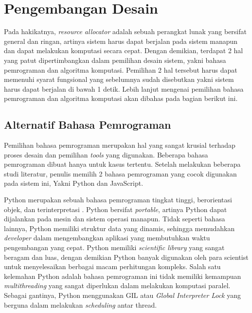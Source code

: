 \section{Pengembangan Desain}
    Pada hakikatnya, \textit{resource allocator} adalah sebuah perangkat lunak yang bersifat general dan ringan, artinya sistem harus dapat berjalan pada sistem manapun
    dan dapat melakukan komputasi secara cepat. Dengan demikian, terdapat 2 hal yang patut dipertimbangkan dalam pemilihan desain sistem, yakni bahasa pemrograman dan algoritma komputasi.
    Pemilihan 2 hal tersebut harus dapat memenuhi syarat fungsional yang sebelumnya sudah disebutkan yakni sistem harus dapat berjalan di bawah 1 detik.
    Lebih lanjut mengenai pemilihan bahasa pemrograman dan algoritma komputasi akan dibahas pada bagian berikut ini.
    \subsection{Alternatif Bahasa Pemrograman}
        Pemilihan bahasa pemrograman merupakan hal yang sangat krusial terhadap proses desain dan pemilihan \textit{tools} yang digunakan. 
        Beberapa bahasa pemrograman dibuat hanya untuk kasus tertentu. Setelah melakukan beberapa studi literatur, penulis memilih 2 bahasa pemrograman
        yang cocok digunakan pada sistem ini, Yakni Python dan JavaScript.

        Python merupakan sebuah bahasa pemrograman tingkat tinggi, berorientasi objek, dan
        terinterpretasi \citep{python}. Python bersifat \textit{portable}, artinya Python dapat dijalankan pada mesin dan sistem operasi manapun.
        Tidak seperti bahasa lainnya, Python memiliki struktur data yang dinamis, sehingga memudahkan \textit{developer} dalam mengembangkan aplikasi yang membutuhkan waktu
        pengembangan yang cepat. Python memiliki \textit{scientific library} yang sangat beragam dan luas, dengan demikian Python banyak digunakan oleh para scientist untuk
        menyelesaikan berbagai macam perhitungan kompleks. Salah satu kelemahan Python adalah bahasa pemrograman ini tidak memiliki kemampuan \textit{multithreading} yang sangat diperlukan
        dalam melakukan komputasi paralel. Sebagai gantinya, Python menggunakan GIL atau \textit{Global Interpreter Lock} yang berguna dalam melakukan \textit{scheduling} antar thread.

        

